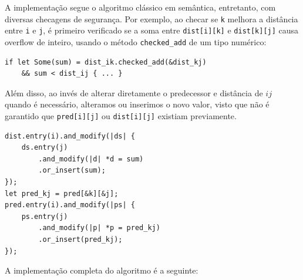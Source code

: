 A implementação segue o algoritmo clássico em semântica, entretanto,
com diversas checagens de segurança. Por exemplo, ao checar se
\texttt{k} melhora a distância entre \texttt{i} e \texttt{j}, é
primeiro verificado se a soma entre \texttt{dist[i][k]} e
\texttt{dist[k][j]} causa overflow de inteiro, usando o método
\texttt{checked\_add} de um tipo numérico:

\begin{verbatim}
if let Some(sum) = dist_ik.checked_add(&dist_kj)
    && sum < dist_ij { ... }
\end{verbatim}

Além disso, ao invés de alterar diretamente o predecessor e distância de
$ij$ quando é necessário, alteramos ou inserimos o novo valor, visto
que não é garantido que \texttt{pred[i][j]} ou \texttt{dist[i][j]}
existiam previamente.

\begin{verbatim}
dist.entry(i).and_modify(|ds| {
    ds.entry(j)
        .and_modify(|d| *d = sum)
        .or_insert(sum);
});
let pred_kj = pred[&k][&j];
pred.entry(i).and_modify(|ps| {
    ps.entry(j)
        .and_modify(|p| *p = pred_kj)
        .or_insert(pred_kj);
});
\end{verbatim}

A implementação completa do algoritmo é a seguinte:

